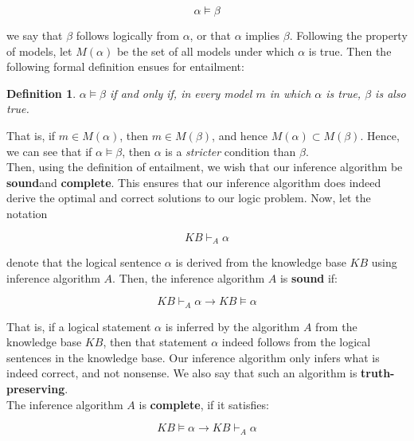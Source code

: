 \documentclass[12pt]{article}
\newtheorem{definition}{Definition}
\begin{document}
\begin{equation*}
\alpha \models \beta
\end{equation*}

we say that $\beta$ follows logically from $\alpha$, or that $\alpha$ implies $\beta$. Following the property of models, let $M(\alpha)$ be the set of all models under which $\alpha$ is true. Then the following formal definition ensues for entailment:

\begin{definition}
$\alpha \models \beta$ if and only if, in every model $m$ in which $\alpha$ is true, $\beta$ is also true.
\end{definition}

That is, if $m \in M(\alpha)$, then $m \in M(\beta)$, and hence $M(\alpha) \subset M(\beta)$. Hence, we can see that if $\alpha \models \beta$, then $\alpha$ is a \textit{stricter} condition than $\beta$. \\

Then, using the definition of entailment, we wish that our inference algorithm be \textbf{sound}and \textbf{complete}. This ensures that our inference algorithm does indeed derive the optimal and correct solutions to our logic problem. Now, let the notation

\begin{equation*}
KB \vdash_A \alpha
\end{equation*}

denote that the logical sentence $\alpha$ is derived from the knowledge base $KB$ using inference algorithm $A$. Then, the inference algorithm $A$ is \textbf{sound} if:

\begin{equation*}
KB \vdash_A \alpha \rightarrow KB \models \alpha
\end{equation*}

That is, if a logical statement $\alpha$ is inferred by the algorithm $A$ from the knowledge base $KB$, then that statement $\alpha$ indeed follows from the logical sentences in the knowledge base. Our inference algorithm only infers what is indeed correct, and not nonsense. We also say that such an algorithm is \textbf{truth-preserving}.\\

The inference algorithm $A$ is \textbf{complete}, if it satisfies:

\begin{equation*}
KB \models \alpha \rightarrow KB \vdash_A \alpha 
\end{equation*}
\end{document}
